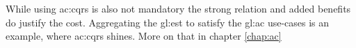 While using \gls{ac:cqrs} is also not mandatory the strong relation and added benefits do justify the cost. Aggregating the \gls{gl:est} to satisfy the \gls{gl:ac} use-cases is an example, where \gls{ac:cqrs} shines. More on that in chapter \ref{chap:ac}








